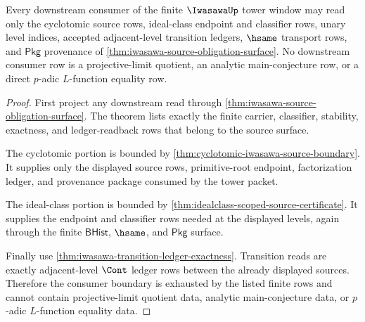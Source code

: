 \begin{theorem}
\label{thm:iwasawa-downstream-consumer-boundary}
Every downstream consumer of the finite $\IwasawaUp$ tower window may read only
the cyclotomic source rows, ideal-class endpoint and classifier rows, unary
level indices, accepted adjacent-level transition ledgers, $\hsame$ transport
rows, and $\mathsf{Pkg}$ provenance of
\autoref{thm:iwasawa-source-obligation-surface}. No downstream consumer row is a
projective-limit quotient, an analytic main-conjecture row, or a direct
$p$-adic $L$-function equality row.
\end{theorem}
\begin{proof}
First project any downstream read through
\autoref{thm:iwasawa-source-obligation-surface}. The theorem lists exactly the
finite carrier, classifier, stability, exactness, and ledger-readback rows that
belong to the source surface.

The cyclotomic portion is bounded by
\autoref{thm:cyclotomic-iwasawa-source-boundary}. It supplies only the
displayed source rows, primitive-root endpoint, factorization ledger, and
provenance package consumed by the tower packet.

The ideal-class portion is bounded by
\autoref{thm:idealclass-scoped-source-certificate}. It supplies the endpoint
and classifier rows needed at the displayed levels, again through the finite
$\mathsf{BHist}$, $\hsame$, and $\mathsf{Pkg}$ surface.

Finally use \autoref{thm:iwasawa-transition-ledger-exactness}. Transition reads
are exactly adjacent-level $\Cont$ ledger rows between the already displayed
sources. Therefore the consumer boundary is exhausted by the listed finite rows
and cannot contain projective-limit quotient data, analytic main-conjecture
data, or $p$-adic $L$-function equality data.
\end{proof}

